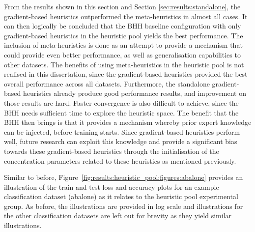 From the results shown in this section and Section \ref{sec:results:standalone}, the gradient-based heuristics outperformed the meta-heuristics in almost all cases. It can then logically be concluded that the \acs{BHH} baseline configuration with only gradient-based heuristics in the heuristic pool yields the best performance. The inclusion of meta-heuristics is done as an attempt to provide a mechanism that could provide even better performance, as well as generalisation capabilities to other datasets. The benefits of using meta-heuristics in the heuristic pool is not realised in this dissertation, since the gradient-based heuristics provided the best overall performance across  all datasets. Furthermore, the standalone gradient-based heuristics already produce good performance results, and improvement on those results are hard. Faster convergence is also difficult to achieve, since the \acs{BHH} needs sufficient time to explore the heuristic space. The benefit that the \acs{BHH} then brings is that it provides a mechanism whereby prior expert knowledge can be injected, before training starts. Since gradient-based heuristics perform well, future research can exploit this knowledge and provide a significant bias towards these gradient-based heuristics through the initialisation of the concentration parameters related to these heuristics as mentioned previously.

Similar to before, Figure~\ref{fig:results:heuristic_pool:figures:abalone} provides an illustration of the train and test loss and accuracy plots for an example classification dataset (abalone) as it relates to the heuristic pool experimental group. As before, the illustrations are provided in log scale and illustrations for the other classification datasets are left out for brevity as they yield similar illustrations.

